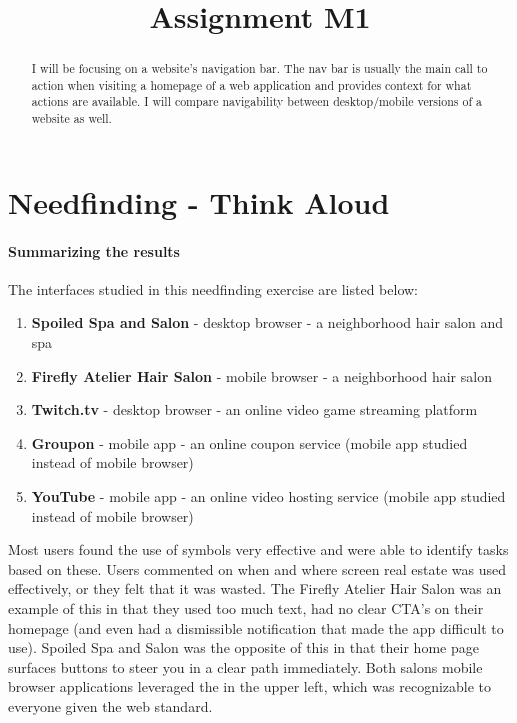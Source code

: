 

\title{Assignment M1\\}



\maketitle
\thispagestyle{fancy}

% 

\begin{abstract}
I will be focusing on a website’s navigation bar. The nav bar is usually the main call to action when visiting a homepage of a web application and provides context for what actions are available. I will compare navigability between desktop/mobile versions of a website as well.
\end{abstract}


\section{Needfinding - Think Aloud}

\paragraph{Summarizing the results}
The interfaces studied in this needfinding exercise are listed below:

\begin{enumerate}
\item
  \textbf{Spoiled Spa and Salon} - desktop browser - a neighborhood hair salon and spa
\item
  \textbf{Firefly Atelier Hair Salon} - mobile browser - a neighborhood hair salon
\item
  \textbf{Twitch.tv} - desktop browser - an online video game streaming platform
\item
  \textbf{Groupon} - mobile app - an online coupon service (mobile app studied instead of mobile browser)
\item
  \textbf{YouTube} - mobile app - an online video hosting service (mobile app studied instead of mobile browser)
\end{enumerate}

Most users found the use of symbols very effective and were able to identify tasks based on these. Users commented on when and where screen real estate was used effectively, or they felt that it was wasted. The Firefly Atelier Hair Salon was an example of this in that they used too much text, had no clear CTA's on their homepage (and even had a dismissible notification that made the app difficult to use). Spoiled Spa and Salon was the opposite of this in that their home page surfaces buttons to steer you in a clear path immediately. Both salons mobile browser applications leveraged the  in the upper left, which was recognizable to everyone given the web standard.

